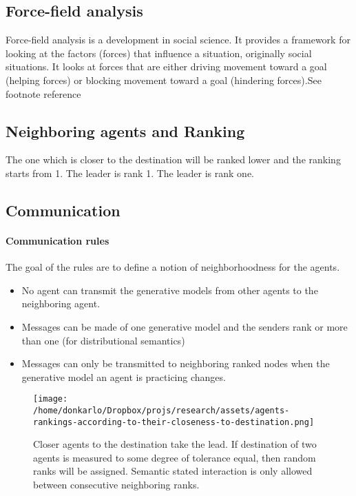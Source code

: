 \documentclass{article}
\begin{document}
		\subsection{Force-field analysis}
		Force-field analysis is a development in social science. It provides a framework for looking at the factors (forces) that influence a situation, originally social situations. It looks at forces that are either driving movement toward a goal (helping forces) or blocking movement toward a goal (hindering forces).See footnote reference \cite{wikipedia-2019-force-field-analysis}
		\cite{campo-2017-static-force-field-representation-of-environments-based-on-agents-nonlinear-motions}
		
		\subsection{Neighboring agents and Ranking}
			The one which is closer to the destination will be ranked lower and the ranking starts from 1. The leader is rank 1. The leader is rank one.
		
		\subsection{Communication}
			\paragraph{Communication rules} The goal of the rules are to define a notion of neighborhoodness for the agents.  
				\begin{itemize}
					\item No agent can transmit the generative models from other agents to the neighboring agent.
					\item Messages can be made of one generative model and the senders rank or more than one (for distributional semantics) 
					\item Messages can only be transmitted to neighboring ranked nodes when the generative model an agent is practicing changes.
				\end{itemize}
			\begin{figure*}
				\centering
				\texttt{[image: /home/donkarlo/Dropbox/projs/research/assets/agents-rankings-according-to-their-closeness-to-destination.png]}
				\caption{Closer agents to the destination take the lead. If destination of two agents is measured to some degree of tolerance equal, then random ranks will be assigned. Semantic stated interaction is only allowed between consecutive neighboring ranks.}
				\label{fig:agents-rankings-according-to-their-closeness-to-destination.png}
			\end{figure*}
		
\end{document}
